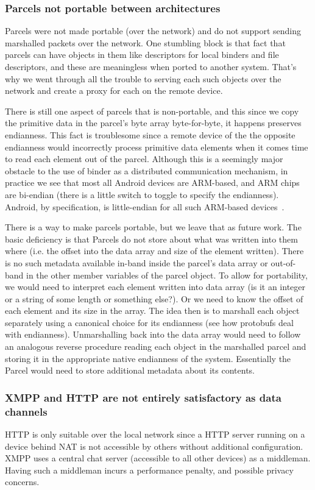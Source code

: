 \documentclass[prodmode]{acmlarge}
\begin{document}
\subsubsection{Parcels not portable between architectures}
Parcels were not made portable (over the network) and do not support sending marshalled packets over the network. One stumbling block is that fact that parcels can have objects in them like descriptors for local binders and file descriptors, and these are meaningless when ported to another system. That's why we went through all the trouble to serving each such objects over the network and create a proxy for each on the remote device.

There is still one aspect of parcels that is non-portable, and this since we copy the primitive data in the parcel's byte array byte-for-byte, it happens preserves endianness. This fact is troublesome since a remote device of the the opposite endianness would incorrectly process primitive data elements when it comes time to read each element out of the parcel.
Although this is a seemingly major obstacle to the use of binder as a distributed communication mechanism, in practice we see that most all Android devices are ARM-based, and ARM chips are bi-endian (there is a little switch to toggle to specify the endianness). Android, by specification, is little-endian for all such ARM-based devices~\cite{ARMLittleEndian}.

There is a way to make parcels portable, but we leave that as future work. The basic deficiency is that Parcels do not store about what was written into them where (i.e. the offset into the data array and size of the element written). There is no such metadata available in-band inside the parcel's data array or out-of-band in the other member variables of the parcel object. To allow for portability, we would need to interpret each element written into data array (is it an integer or a string of some length or something else?). Or we need to know the offset of each element and its size in the array. The idea then is to marshall each object separately using a canonical choice for its endianness (see how protobufs deal with endianness). Unmarshalling back into the data array would need to follow an analogous reverse procedure reading each object in the marshalled parcel and storing it in the appropriate native endianness of the system. Essentially the Parcel would need to store additional metadata about its contents.

\subsubsection{XMPP and HTTP are not entirely satisfactory as data channels}
HTTP is only suitable over the local network since a HTTP server running on a device behind NAT is not accessible by others without additional configuration. XMPP uses a central chat server (accessible to all other devices) as a middleman. Having such a middleman incurs a performance penalty, and possible privacy concerns.
\end{document}
